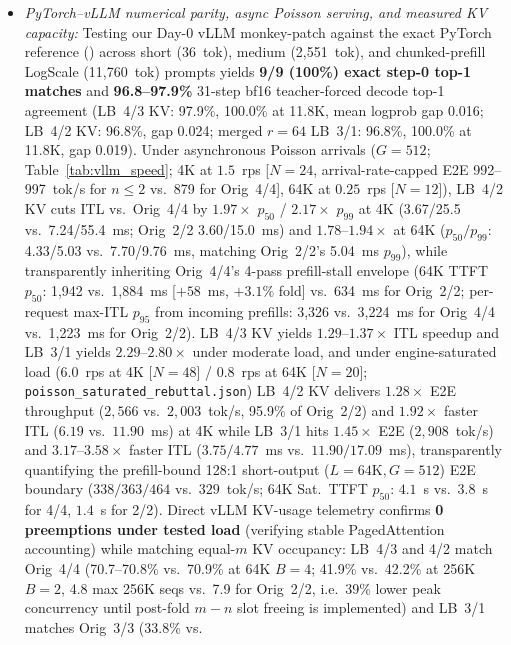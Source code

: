 \documentclass[11pt]{article}
\begin{document}
\begin{itemize}
\item \emph{PyTorch--vLLM numerical parity, async Poisson serving, and measured KV capacity:} Testing our Day-0 vLLM
monkey-patch against the exact PyTorch reference () across short (36~tok), medium
(2,551~tok), and chunked-prefill LogScale (11,760~tok) prompts yields \textbf{9/9 (100\%) exact step-0 top-1 matches}
and \textbf{96.8--97.9\%} 31-step bf16 teacher-forced decode top-1 agreement (LB~4/3 KV: 97.9\%, 100.0\% at 11.8K, mean
logprob gap 0.016; LB~4/2 KV: 96.8\%, gap 0.024; merged $r{=}64$ LB~3/1: 96.8\%, 100.0\% at 11.8K, gap 0.019). Under
asynchronous Poisson arrivals ($G{=}512$; Table~\ref{tab:vllm_speed}; 4K at $1.5$~rps [$N{=}24$, arrival-rate-capped
E2E 992--997~tok/s for $n{\le}2$ vs.\ 879 for Orig~4/4], 64K at $0.25$~rps [$N{=}12$]), LB~4/2 KV cuts ITL vs.\ Orig~4/4
by $1.97\times$ $p_{50}$ / $2.17\times$ $p_{99}$ at 4K (3.67/25.5 vs.\ 7.24/55.4~ms; Orig~2/2 3.60/15.0~ms) and
$1.78$--$1.94\times$ at 64K ($p_{50}/p_{99}$: 4.33/5.03 vs.\ 7.70/9.76~ms, matching Orig~2/2's 5.04~ms $p_{99}$), while
transparently inheriting Orig~4/4's 4-pass prefill-stall envelope (64K TTFT $p_{50}$: 1,942 vs.\ 1,884~ms [$+58$~ms,
$+3.1\%$ fold] vs.\ 634~ms for Orig~2/2; per-request max-ITL $p_{95}$ from incoming prefills: 3,326 vs.\ 3,224~ms for
Orig~4/4 vs.\ 1,223~ms for Orig~2/2). LB~4/3 KV yields $1.29$--$1.37\times$ ITL speedup and LB~3/1 yields
$2.29$--$2.80\times$ under moderate load, and under engine-saturated load ($6.0$~rps at 4K [$N{=}48$] / $0.8$~rps at 64K
[$N{=}20$]; \texttt{poisson\_saturated\_rebuttal.json}) LB~4/2 KV delivers $1.28\times$ E2E throughput ($2{,}566$ vs.\
$2{,}003$~tok/s, 95.9\% of Orig~2/2) and $1.92\times$ faster ITL ($6.19$ vs.\ $11.90$~ms) at 4K while LB~3/1 hits
$1.45\times$ E2E ($2{,}908$~tok/s) and $3.17$--$3.58\times$ faster ITL ($3.75 / 4.77$~ms vs.\ $11.90 / 17.09$~ms), transparently
quantifying the prefill-bound 128:1 short-output ($L{=}64\text{K}, G{=}512$) E2E boundary ($338 / 363 / 464$ vs.\
$329$~tok/s; 64K Sat.\ TTFT $p_{50}$: $4.1$~s vs.\ $3.8$~s for 4/4, $1.4$~s for 2/2). Direct vLLM KV-usage telemetry confirms \textbf{0 preemptions under tested load} (verifying
stable PagedAttention accounting) while matching equal-$m$ KV occupancy: LB~4/3 and 4/2 match Orig~4/4 (70.7--70.8\%
vs.\ 70.9\% at 64K $B{=}4$; 41.9\% vs.\ 42.2\% at 256K $B{=}2$, 4.8 max 256K seqs vs.\ 7.9 for Orig~2/2, i.e.\ 39\%
lower peak concurrency until post-fold $m{-}n$ slot freeing is implemented) and LB~3/1 matches Orig~3/3 (33.8\% vs.\

\end{itemize}
\end{document}
